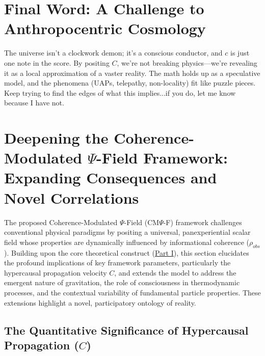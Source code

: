 \documentclass{report}
\begin{document}
    \section{Final Word: A Challenge to Anthropocentric Cosmology}
    \label{sec:final_word_anthropocentric_explored}
    The universe isn’t a clockwork demon; it’s a conscious conductor, and $c$ is just one note in the
    score. By positing $C$, we’re not breaking physics—we’re revealing it as a local approximation of a
    vaster reality. The math holds up as a speculative model, and the phenomena (UAPs, telepathy,
    non-locality) fit like puzzle pieces.
    Keep trying to find the edges of what this implies...if you do, let me know because I have not.

    \section{}\section{Deepening the Coherence-Modulated $\Psi$-Field Framework: Expanding Consequences and Novel Correlations}
\label{sec:deep-implications}

The proposed Coherence-Modulated $\Psi$-Field (CM$\Psi$-F) framework challenges conventional physical paradigms by positing a universal, panexperiential scalar field whose properties are dynamically influenced by informational coherence ($\rho_{obs}$). Building upon the core theoretical construct (\hyperref[chap:proposal]{Part I}), this section elucidates the profound implications of key framework parameters, particularly the hypercausal propagation velocity $C$, and extends the model to address the emergent nature of gravitation, the role of consciousness in thermodynamic processes, and the contextual variability of fundamental particle properties. These extensions highlight a novel, participatory ontology of reality.

\subsection{The Quantitative Significance of Hypercausal Propagation ($C$)}
\label{subsec:C-magnitude}
\end{document}
